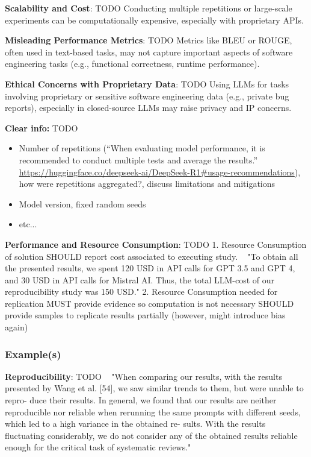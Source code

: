 \textbf{Scalability and Cost}: TODO
Conducting multiple repetitions or large-scale experiments can be computationally expensive, especially with proprietary APIs.

\textbf{Misleading Performance Metrics}: TODO
Metrics like BLEU or ROUGE, often used in text-based tasks, may not capture important aspects of software engineering tasks (e.g., functional correctness, runtime performance).

\textbf{Ethical Concerns with Proprietary Data}: TODO
Using LLMs for tasks involving proprietary or sensitive software engineering data (e.g., private bug reports), especially in closed-source LLMs may raise privacy and IP concerns.

\textbf{Clear info:} TODO
\begin{itemize}
  \item Number of repetitions (``When evaluating model performance, it is recommended to conduct multiple tests and average the results.'' \url{https://huggingface.co/deepseek-ai/DeepSeek-R1\#usage-recommendations}), how were repetitions aggregated?, discuss limitations and mitigations
  \item Model version, fixed random seeds
  \item etc...
\end{itemize}

\textbf{Performance and Resource Consumption}: TODO
1. Resource Consumption of solution
SHOULD report cost associated to executing study. ~\cite{10.1145/3673791.3698432} "To obtain all the presented results, we spent 120 USD in API calls for GPT 3.5 and GPT 4, and 30 USD in API calls for Mistral AI. Thus, the total LLM-cost of our reproducibility study was 150 USD."
2. Resource Consumption needed for replication
MUST provide evidence so computation is not necessary
SHOULD provide samples to replicate results partially (however, might introduce bias again)


\subsubsection{Example(s)}
\textbf{Reproducibility}: TODO
~\cite{10.1145/3673791.3698432} "When comparing our results, with the results presented by Wang et al. [54], we saw similar trends to them, but were unable to repro- duce their results. In general, we found that our results are neither reproducible nor reliable when rerunning the same prompts with different seeds, which led to a high variance in the obtained re- sults. With the results fluctuating considerably, we do not consider any of the obtained results reliable enough for the critical task of systematic reviews."

